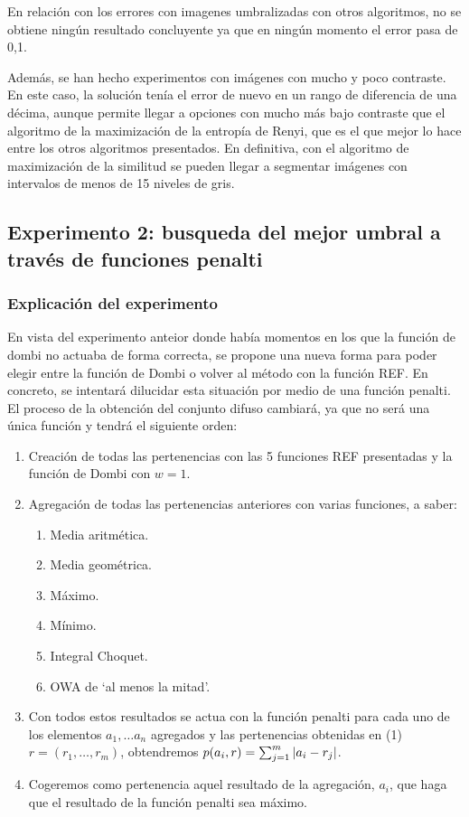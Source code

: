 En relación con los errores con imagenes umbralizadas con otros algoritmos, no se obtiene ningún resultado concluyente ya que en ningún momento el error pasa de 0,1.

Además, se han hecho experimentos con imágenes con mucho y poco contraste. En este caso, la solución tenía el error de nuevo en un rango de diferencia de una décima, aunque permite llegar a opciones con mucho más bajo contraste que el algoritmo de la maximización de la entropía de Renyi, que es el que mejor lo hace entre los otros algoritmos presentados. En definitiva, con el algoritmo de maximización de la similitud se pueden llegar a segmentar imágenes con intervalos de menos de 15 niveles de gris. 


\subsection{Experimento 2: busqueda del mejor umbral a través de funciones penalti}
\subsubsection{Explicación del experimento}
En vista del experimento anteior donde había momentos en los que la función de dombi no actuaba de forma correcta, se propone una nueva forma para poder elegir entre la función de Dombi o volver al método con la función REF. En concreto, se intentará dilucidar esta situación por medio de una función penalti. El proceso de la obtención del conjunto difuso cambiará, ya que no será una única función y tendrá el siguiente orden:
\begin{enumerate}
    \item Creación de todas las pertenencias con las 5 funciones REF presentadas y la función de Dombi con $w=1$.
    \item Agregación de todas las pertenencias anteriores con varias funciones, a saber:
        \begin{enumerate}
            \item Media aritmética.
            \item Media geométrica.
            \item Máximo.
            \item Mínimo.
            \item Integral Choquet.
            \item OWA de `al menos la mitad'. 
        \end{enumerate}    
    \item Con todos estos resultados se actua con la función penalti para cada uno de los elementos $a_1,\dots a_n$ agregados y las pertenencias obtenidas en (1) $r=(r_1,\dots, r_m)$, obtendremos $p(a_i, r)=\sum_{j=1}^m \left\vert a_i-r_j\right\vert$.
    \item Cogeremos como pertenencia aquel resultado de la agregación, $a_i$, que haga que el resultado de la función penalti sea máximo.  
\end{enumerate}

